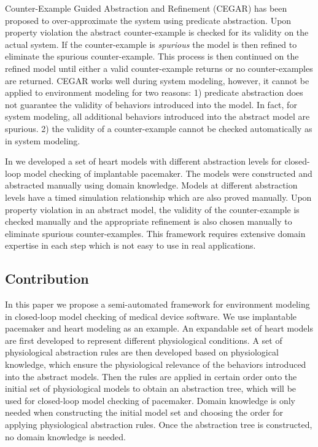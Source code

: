 Counter-Example Guided Abstraction and Refinement (CEGAR) \cite{CEGAR} has been proposed to over-approximate the system using predicate abstraction. Upon property violation the abstract counter-example is checked for its validity on the actual system. If the counter-example is \emph{spurious} the model is then refined to eliminate the spurious counter-example. This process is then continued on the refined model until either a valid counter-example returns or no counter-examples are returned. CEGAR works well during system modeling, however, it cannot be applied to environment modeling for two reasons: 1) predicate abstraction does not guarantee the validity of behaviors introduced into the model. In fact, for system modeling, all additional behaviors introduced into the abstract model are spurious. 2) the validity of a counter-example cannot be checked automatically as in system modeling.

In \cite{sttt13} we developed a set of heart models with different abstraction levels for closed-loop model checking of implantable pacemaker. The models were constructed and abstracted manually using domain knowledge. Models at different abstraction levels have a timed simulation relationship which are also proved manually. Upon property violation in an abstract model, the validity of the counter-example is checked manually and the appropriate refinement is also chosen manually to eliminate spurious counter-examples. This framework requires extensive domain expertise in each step which is not easy to use in real applications.

\subsection{Contribution}
In this paper we propose a semi-automated framework for environment modeling in closed-loop model checking of medical device software. We use implantable pacemaker and heart modeling as an example. An expandable set of heart models are first developed to represent different physiological conditions. 
A set of physiological abstraction rules are then developed based on physiological knowledge, which ensure the physiological relevance of the behaviors introduced into the abstract models. Then the rules are applied in certain order onto the initial set of physiological models to obtain an abstraction tree, which will be used for closed-loop model checking of pacemaker. Domain knowledge is only needed when constructing the initial model set and choosing the order for applying physiological abstraction rules. Once the abstraction tree is constructed, no domain knowledge is needed. 

